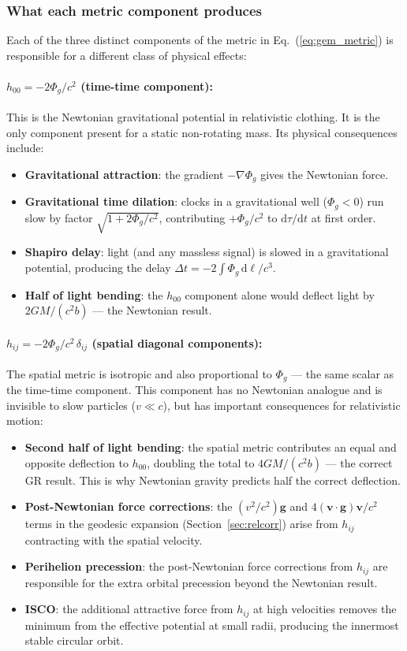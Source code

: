 \documentclass[11pt,a4paper]{article}
\newcommand{\vv}[1]{\mathbf{#1}}
\newcommand{\Phig}{\Phi_g}
\newcommand{\dd}{\mathrm{d}}
\begin{document}
\subsubsection*{What each metric component produces}

Each of the three distinct components of the metric in Eq.~(\ref{eq:gem_metric}) is responsible for a different class of physical effects:

\paragraph{$h_{00} = -2\Phig/c^2$ (time-time component):}
This is the Newtonian gravitational potential in relativistic clothing.  It is the only component present for a static non-rotating mass.  Its physical consequences include:
\begin{itemize}
  \item \textbf{Gravitational attraction}: the gradient $-\nabla\Phig$ gives the Newtonian force.
  \item \textbf{Gravitational time dilation}: clocks in a gravitational well ($\Phig < 0$) run slow by factor $\sqrt{1+2\Phig/c^2}$, contributing $+\Phig/c^2$ to $\dd\tau/\dd t$ at first order.
  \item \textbf{Shapiro delay}: light (and any massless signal) is slowed in a gravitational potential, producing the delay $\Delta t = -2\int\Phig\,\dd\ell/c^3$.
  \item \textbf{Half of light bending}: the $h_{00}$ component alone would deflect light by $2GM/(c^2 b)$ --- the Newtonian result.
\end{itemize}

\paragraph{$h_{ij} = -2\Phig/c^2\,\delta_{ij}$ (spatial diagonal components):}
The spatial metric is isotropic and also proportional to $\Phig$ --- the same scalar as the time-time component.  This component has no Newtonian analogue and is invisible to slow particles ($v\ll c$), but has important consequences for relativistic motion:
\begin{itemize}
  \item \textbf{Second half of light bending}: the spatial metric contributes an equal and opposite deflection to $h_{00}$, doubling the total to $4GM/(c^2 b)$ --- the correct GR result.  This is why Newtonian gravity predicts half the correct deflection.
  \item \textbf{Post-Newtonian force corrections}: the $(v^2/c^2)\vv{g}$ and $4(\vv{v}\cdot\vv{g})\vv{v}/c^2$ terms in the geodesic expansion (Section~\ref{sec:relcorr}) arise from $h_{ij}$ contracting with the spatial velocity.
  \item \textbf{Perihelion precession}: the post-Newtonian force corrections from $h_{ij}$ are responsible for the extra orbital precession beyond the Newtonian result.
  \item \textbf{ISCO}: the additional attractive force from $h_{ij}$ at high velocities removes the minimum from the effective potential at small radii, producing the innermost stable circular orbit.
\end{itemize}
\end{document}
